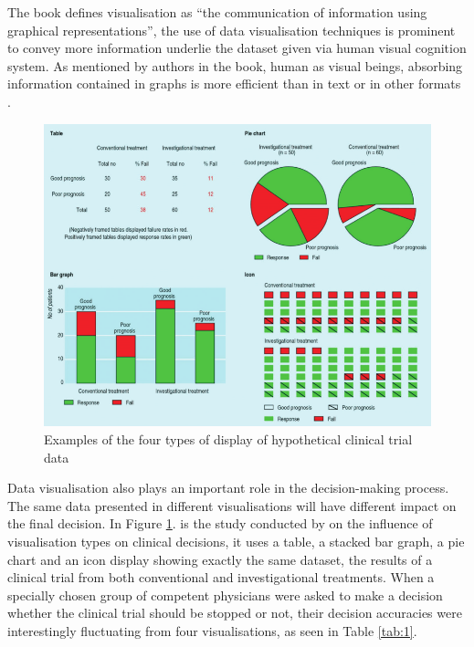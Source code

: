 \documentclass[11pt,a4paper]{article}
\begin{document}
The book defines visualisation as ``the communication of information using graphical representations'', the use of data visualisation techniques is prominent to convey more information underlie the dataset given via human visual cognition system. As mentioned by authors in the book, human as visual beings, absorbing information contained in graphs is more efficient than in text or in other formats \parencite[pp. 3-5]{Ward2010}.

\begin{figure}[H]
	\centering
	\includegraphics[width=\textwidth,keepaspectratio]{figures/fig1.png}
	\caption{\label{fig:1}Examples of the four types of display of hypothetical clinical trial data \parencite{Elting1999}}
\end{figure}

Data visualisation also plays an important role in the decision-making process. The same data presented in different visualisations will have different impact on the final decision. In Figure \ref{fig:1}. is the study conducted by \parencite{Elting1999} on the influence of visualisation types on clinical decisions, it uses a table, a stacked bar graph, a pie chart and an icon display showing exactly the same dataset, the results of a clinical trial from both conventional and investigational treatments. When a specially chosen group of competent physicians were asked to make a decision whether the clinical trial should be stopped or not, their decision accuracies were interestingly fluctuating from four visualisations, as seen in Table \ref{tab:1}.
\end{document}
